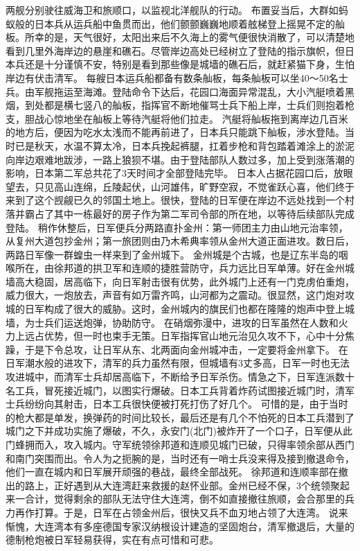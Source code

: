 \documentclass[12pt,UTF8]{ctexbook}
\begin{document}
两舰分别驶往威海卫和旅顺口，以监视北洋舰队的行动。
布置妥当后，大群如蚂蚁般的日本兵从运兵船中鱼贯而出，他们颤颤巍巍地顺着舷梯登上摇晃不定的舢板。所幸的是，天气很好，太阳出来后不久海上的雾气便很快消散了，可以清楚地看到几里外海岸边的悬崖和礁石。尽管岸边高处已经树立了登陆的指示旗帜，但日本兵还是十分谨慎不安，特别是看到那些像是城墙的礁石后，就赶紧猫下身，生怕岸边有伏击清军。
每艘日本运兵船都备有数条舢板，每条舢板可以坐40～50名士兵。由军舰拖运至海滩。登陆命令下达后，花园口海面异常混乱，大小汽艇喷着黑烟，到处都是横七竖八的舢板，指挥官不断地催骂士兵下船上岸，士兵们则抱着枪支，胆战心惊地坐在舢板上等待汽艇将他们拉走。
汽艇将舢板拖到离岸边几百米的地方后，便因为吃水太浅而不能再前进了，日本兵只能跳下舢板，涉水登陆。当时已是秋天，水温不算太冷，日本兵挽起裤腿，扛着步枪和背包踏着滩涂上的淤泥向岸边艰难地跋涉，一路上狼狈不堪。由于登陆部队人数过多，加上受到涨落潮的影响，日本第二军总共花了3天时间才全部登陆完毕。
日本人占据花园口后，放眼望去，只见高山连绵，丘陵起伏，山河雄伟，旷野空寂，不觉雀跃心喜，他们终于来到了这个觊觎已久的邻国土地上。很快，登陆的日军便在岸边不远处找到一个村落并霸占了其中一栋最好的房子作为第二军司令部的所在地，以等待后续部队完成登陆。
稍作休整后，日军便兵分两路直扑金州：第一师团主力由山地元治率领，从复州大道包抄金州；第一旅团则由乃木希典率领从金州大道正面进攻。数日后，两路日军像一群蝗虫一样来到了金州城下。
金州城是个古城，也是辽东半岛的咽喉所在，由徐邦道的拱卫军和连顺的捷胜营防守，兵力远比日军单薄。好在金州城墙高大稳固，居高临下，向日军射击很有优势，此外城门上还有一门克虏伯重炮，威力很大，一炮放去，声音有如万雷齐鸣，山河都为之震动。很显然，这门炮对攻城的日军构成了很大的威胁。这时，金州城内的旗民们也都在隆隆的炮声中登上城墙，为士兵们运送炮弹，协助防守。
在硝烟弥漫中，进攻的日军虽然在人数和火力上远占优势，但一时也束手无策。日军指挥官山地元治见久攻不下，心中十分焦躁，于是下令总攻，让日军从东、北两面向金州城冲击，一定要将金州拿下。
在日军潮水般的进攻下，清军的兵力虽然有限，但城墙有3丈多高，日军一时也无法攻进城中，而清军士兵却居高临下，不断给予日军杀伤。情急之下，日军连派数十名工兵，冒死接近城门，以图实行爆破。日本工兵背着炸药试图接近城门时，清军士兵纷纷向其射击，日本工兵很快便被打死打伤了好几个。
可惜的是，由于当时的枪大都是单发，换弹药的时间比较长，最后还是有几个不怕死的日本工兵潜到了城门之下并成功实施了爆破，不久，永安门(北门)被炸开了一个口子，日军便从此门蜂拥而入，攻入城内。守军统领徐邦道和连顺见城门已破，只得率领余部从西门和南门突围而出。令人为之扼腕的是，当时还有一哨士兵没来得及接到撤退命令，他们一直在城内和日军展开顽强的巷战，最终全部战死。
徐邦道和连顺率部在撤出的路上，正好遇到从大连湾赶来救援的赵怀业部。金州已经不保，3个统领聚起来一合计，觉得剩余的部队无法守住大连湾，倒不如直接撤往旅顺，会合那里的兵力再作打算。于是，日军在占领金州后，很快又兵不血刃地占领了大连湾。
说来惭愧，大连湾本有多座德国专家汉纳根设计建造的坚固炮台，清军撤退后，大量的德制枪炮被日军轻易获得，实在有点可惜和可悲。
\end{document}
